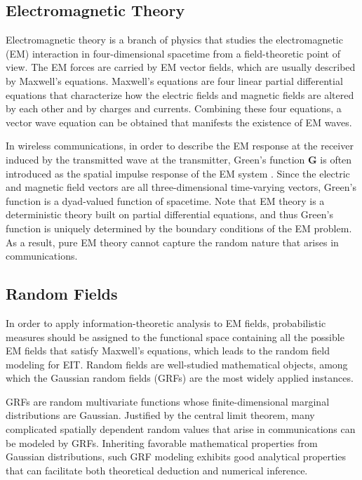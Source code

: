 \documentclass[journal,twocolumn]{IEEEtran}
\begin{document}
\subsection{Electromagnetic Theory}
\label{Sec_2_Subsec_3}
Electromagnetic theory is a branch of physics that studies the electromagnetic (EM) interaction in four-dimensional spacetime from a field-theoretic point of view. The EM forces are carried by EM vector fields, which are usually described by Maxwell's equations. Maxwell's equations are four linear partial differential equations that characterize how the electric fields and magnetic fields are altered by each other and by charges and currents. Combining these four equations, a vector wave equation can be obtained that manifests the existence of EM waves. 

In wireless communications, in order to describe the EM response at the receiver induced by the transmitted wave at the transmitter, Green's function $\bm G$ is often introduced as the spatial impulse response of the EM system \cite{stratton2007electromagnetic}. Since the electric and magnetic field vectors are all three-dimensional time-varying vectors, Green's function is a dyad-valued function of spacetime. 
Note that EM theory is a deterministic theory built on partial differential equations, and thus Green's function is uniquely determined by the boundary conditions of the EM problem.
As a result, pure EM theory cannot capture the random nature that arises in communications. 

\subsection{Random Fields}
\label{Sec_2_Subsec_4}
In order to apply information-theoretic analysis to EM fields, probabilistic measures should be assigned to the functional space containing all the possible EM fields that satisfy Maxwell's equations, which leads to the random field modeling for EIT. 
Random fields are well-studied mathematical objects, among which the Gaussian random fields (GRFs) are the most widely applied instances. 

GRFs are random multivariate functions whose finite-dimensional marginal distributions are Gaussian. Justified by the central limit theorem, many complicated spatially dependent random values that arise in communications can be modeled by GRFs.  
Inheriting favorable mathematical properties from Gaussian distributions, such GRF modeling exhibits good analytical properties that can facilitate both theoretical deduction and numerical inference. 
\end{document}
